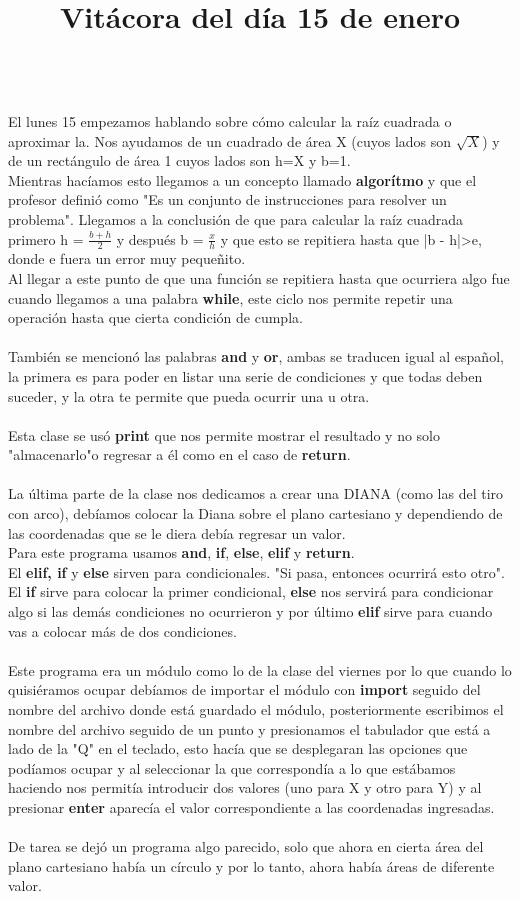 \documentclass{article}
\begin{document}
	\title{\huge\textbf{Vitácora del día 15 de enero\\}} \\
	El lunes 15 empezamos hablando sobre cómo calcular la raíz cuadrada o aproximar la. Nos ayudamos de un cuadrado de área X (cuyos lados son $\sqrt{X}$) y de un rectángulo de área 1 cuyos lados son h=X y b=1. \\
	Mientras hacíamos esto llegamos a un concepto llamado \textbf{algorítmo} y que el profesor definió como "Es un conjunto de instrucciones para resolver un problema". Llegamos a la conclusión de que para calcular la raíz cuadrada primero h = $\frac{b+h}{2}$ y después b = $\frac{x}{h}$ y que esto se repitiera hasta que |b - h|>e, donde e fuera un error muy pequeñito.\\
	Al llegar a este punto de que una función se repitiera hasta que ocurriera algo fue cuando llegamos a una palabra \textbf{while}, este ciclo nos permite repetir una operación hasta que cierta condición de cumpla.\\ \\
	También se mencionó las palabras \textbf{and} y \textbf{or}, ambas se traducen igual al español, la primera es para poder en listar una serie de condiciones y que todas deben suceder, y la otra te permite que pueda ocurrir una u otra.\\ \\
	Esta clase se usó \textbf{print} que nos permite mostrar el resultado y no solo "almacenarlo"o regresar a él como en el caso de \textbf{return}.\\ \\
	La última parte de la clase nos dedicamos a crear una DIANA (como las del tiro con arco), debíamos colocar la Diana sobre el plano cartesiano y dependiendo de las coordenadas que se le diera debía regresar un valor. \\
	Para este programa usamos \textbf{and}, \textbf{if}, \textbf{else}, \textbf{elif} y \textbf{return}. \\
	El \textbf{elif, if} y \textbf{else} sirven para condicionales. "Si pasa, entonces ocurrirá esto otro". El \textbf{if} sirve para colocar la primer condicional, \textbf{else} nos servirá para condicionar algo si las demás condiciones no ocurrieron y por último \textbf{elif} sirve para cuando vas a colocar más de dos condiciones.\\ \\
	Este programa era un módulo como lo de la clase del viernes por lo que cuando lo quisiéramos ocupar debíamos de importar el módulo con \textbf{import} seguido del nombre del archivo donde está guardado el módulo, posteriormente escribimos el nombre del archivo seguido de un punto y presionamos el tabulador que está a lado de la "Q" en el teclado, esto hacía que se desplegaran las opciones que podíamos ocupar y al seleccionar la que correspondía a lo que estábamos haciendo nos permitía introducir dos valores (uno para X y otro para Y) y al presionar \textbf{enter} aparecía el valor correspondiente a las coordenadas ingresadas. \\ \\
	De tarea se dejó un programa algo parecido, solo que ahora en cierta área del plano cartesiano había un círculo y por lo tanto, ahora había áreas de diferente valor.
	
	
	
	
\end{document}
